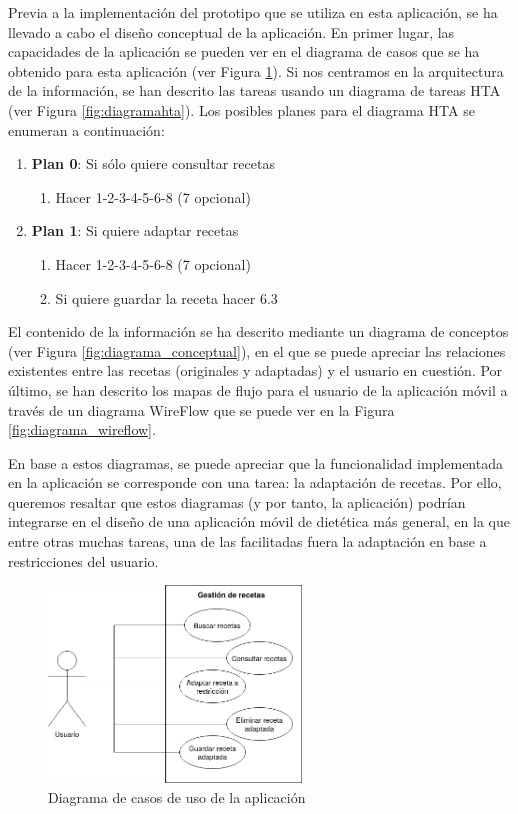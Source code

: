 Previa a la implementación del prototipo que se utiliza en esta aplicación, se ha llevado a cabo el diseño conceptual de la aplicación. En primer lugar, las capacidades de la aplicación se pueden ver en el diagrama de casos que se ha obtenido para esta aplicación (ver Figura \ref{fig:diagrama_casos}). Si nos centramos en la arquitectura de la información, se han descrito las tareas usando un diagrama de tareas HTA (ver Figura \ref{fig:diagramahta}). Los posibles planes para el diagrama HTA se enumeran a continuación:
\begin{enumerate}
    \item \textbf{Plan 0}: Si sólo quiere consultar recetas
    \begin{enumerate}
        \item Hacer 1-2-3-4-5-6-8 (7 opcional)
    \end{enumerate}
    \item \textbf{Plan 1}: Si quiere adaptar recetas
        \begin{enumerate}
        \item Hacer 1-2-3-4-5-6-8 (7 opcional)
        \item Si quiere guardar la receta hacer 6.3
    \end{enumerate}
\end{enumerate}


El contenido de la información se ha descrito mediante un diagrama de conceptos (ver Figura \ref{fig:diagrama_conceptual}), en el que se puede apreciar las relaciones existentes entre las recetas (originales y adaptadas) y el usuario en cuestión. Por último, se han descrito los mapas de flujo para el usuario de la aplicación móvil a través de un diagrama WireFlow que se puede ver en la Figura \ref{fig:diagrama_wireflow}.

En base a estos diagramas, se puede apreciar que la funcionalidad implementada en la aplicación se corresponde con una tarea: la adaptación de recetas. Por ello, queremos resaltar que estos diagramas (y por tanto, la aplicación) podrían integrarse en el diseño de una aplicación móvil de dietética más general, en la que entre otras muchas tareas, una de las facilitadas fuera la adaptación en base a restricciones del usuario.


\begin{figure}[H]
    \centering
    \includegraphics[width=0.6\textwidth]{imagenes/app/diagramas/Casos de uso.png}
    \caption{Diagrama de casos de uso de la aplicación}
    \label{fig:diagrama_casos}
\end{figure}


